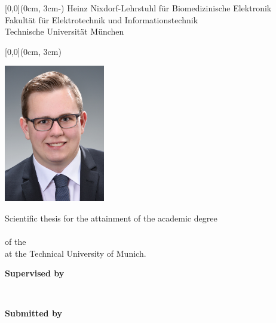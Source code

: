 \begin{textblock*}{\textwidth}[0,0](0cm, 3cm-\SeitenrandOben)%
	\textcolor{TUMblau}{Heinz Nixdorf-Lehrstuhl für Biomedizinische Elektronik\\
	Fakultät für Elektrotechnik und Informationstechnik\\
	Technische Universität München}
\end{textblock*}
	
	
\begin{textblock*}{\textwidth}[0,0](0cm, 3cm)%
	{\fontsize{24pt}{26pt}\selectfont\textbf{\Titel}}
	
		
	\vspace*{14pt}
	\begin{center}
	\includegraphics[height=60mm, keepaspectratio]{./Ressourcen/IMG/FotoStudent}
	\end{center}
		
\end{textblock*}
	
	
\vspace*{125.2mm}
\fontsize{15pt}{17.5pt}\selectfont%
Scientific thesis for the attainment of the academic degree\\
\Grad\\
of the \Fakultaet{}\\ at the Technical University of Munich.
	
\renewcommand{\baselinestretch}{1.47}
\normalsize\selectfont
\vspace*{4.3mm}
\textbf{Supervised by}\tab
\begin{minipage}[t]{\textwidth-\CurrentLineWidth}
	\BetreutVonBetreuer\\
	\BetreutVonProf\strut
\end{minipage}
	
\textbf{Submitted by}\tab
\begin{minipage}[t]{\textwidth-\CurrentLineWidth}
	\EingereichtVon\\
	\Matrikelnummer
\end{minipage}
	
